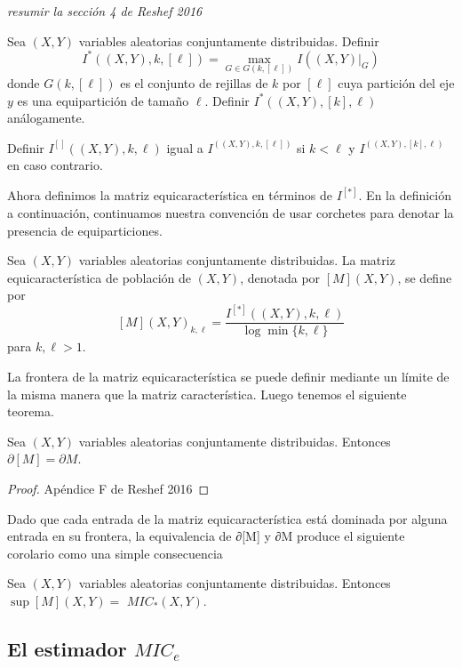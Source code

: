 	
	
	{\textit{resumir la secci\'on 4 de Reshef 2016}}

	\begin{defn}
		Sea $(X, Y)$ variables aleatorias conjuntamente distribuidas. Definir
		$$
		I^*((X, Y), k,[\ell])=\max _{G \in G(k,[\ell])} I\left(\left.(X, Y)\right|_G\right)
		$$
		donde $G(k,[\ell])$ es el conjunto de rejillas de $k$ por $[\ell]$ cuya partición del eje $y$ es una equipartición de tamaño $\ell$. Definir $I^*((X, Y),[k], \ell)$ análogamente.

		Definir $I^{[]}((X, Y), k, \ell)$ igual a $I^((X, Y), k,[\ell])$ si $k<\ell$ y $I^((X, Y),[k], \ell)$ en caso contrario.
	\end{defn}

	Ahora definimos la matriz equicaracterística en términos de $I^{[*]}$. En la definición a continuación, continuamos nuestra convención de usar corchetes para denotar la presencia de equiparticiones.

	\begin{defn}
		Sea $(X, Y)$ variables aleatorias conjuntamente distribuidas. La matriz equicaracterística de población de $(X, Y)$, denotada por $[M](X, Y)$, se define por
		$$
		[M](X, Y)_{k, \ell}=\frac{I^{[*]}((X, Y), k, \ell)}{\log \min \{k, \ell\}}
		$$
		para $k, \ell>1$.
	\end{defn}

	La frontera de la matriz equicaracterística se puede definir mediante un límite de la misma manera que la matriz característica. Luego tenemos el siguiente teorema.

	\begin{thm}
		Sea $(X, Y)$ variables aleatorias conjuntamente distribuidas. Entonces $\partial[M]=\partial M$.
	\end{thm}
	\begin{proof}
		Ap\'endice F de Reshef 2016
	\end{proof}

	Dado que cada entrada de la matriz equicaracterística está dominada por alguna entrada en su frontera, la equivalencia de ∂[M] y ∂M produce el siguiente corolario como una simple consecuencia

	\begin{cor}
		Sea $(X, Y)$ variables aleatorias conjuntamente distribuidas. Entonces $\sup [M](X, Y)=$ $M I C_*(X, Y)$.
	\end{cor}

	\subsection[short]{El estimador $MIC_e$}

